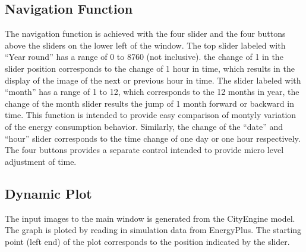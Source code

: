 \documentclass[hidelinks,12pt]{article}
\begin{document}
\subsection {Navigation Function}
The navigation function is achieved with the four slider and the four
buttons above the sliders on the lower left of the window. The top
slider labeled with ``Year round'' has a range of 0 to 8760 (not
inclusive). the change of 1 in the slider position corresponds to the
change of 1 hour in time, which results in the display of the image of
the next or previous hour in time. The slider labeled with ``month''
has a range of 1 to 12, which corresponds to the 12 months in year,
the change of the month slider results the jump of 1 month forward or
backward in time. This function is intended to provide easy comparison
of montyly variation of the energy consumption behavior. Similarly,
the change of the ``date'' and ``hour'' slider corresponds to the time
change of one day or one hour respectively. The four buttons provides
a separate control intended to provide micro level adjustment of time.

\subsection {Dynamic Plot}
The input images to the main window is generated from the CityEngine
model. The graph is ploted by reading in simulation data from
EnergyPlus. The starting point (left end) of the plot corresponds to
the position indicated by the slider. 
\end{document}

